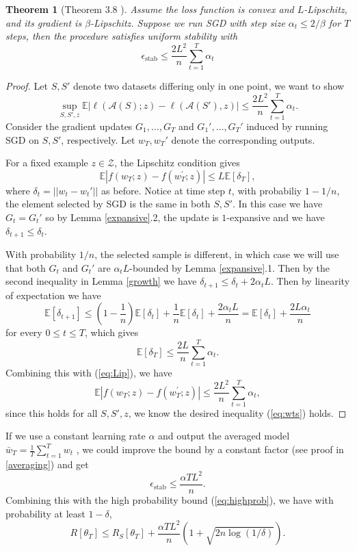 \documentclass{article}[12pt]
\newtheorem{theorem}{Theorem}
\def\A{\mathcal{A}}
\def\E{\mathbb{E}}
\def\Z{\mathcal{Z}}
\newcommand{\norm}[1]{\left|\left|#1\right|\right|}
\newcommand{\abs}[1]{\left\vert#1\right\vert}
\def \E{\mathbb{E}}
\begin{document}
\begin{theorem}[Theorem 3.8 \cite{trainfaster}] \label{sgdstable}
Assume the loss function is convex and $L$-Lipschitz, and its gradient is $\beta$-Lipschitz. Suppose we run SGD with step size $\alpha_t \leq 2/\beta$ for $T$ steps, then the procedure satisfies uniform stability with 
\[
\epsilon_{\text{stab}} \leq \frac{2L^2}{n} \sum_{t=1}^T \alpha_t   
\]
\end{theorem} 
\begin{proof}
Let $S, S'$ denote two datasets differing only in one point, we want to show 
\begin{equation}
   \label{eq:wts}
\sup_{S, S', z} \E\abs{\ell(\A(S); z) - \ell(\A(S'), z)} \leq \frac{2L^2}{n} \sum_{t=1}^T \alpha_t.
\end{equation}
Consider the gradient updates $G_1, \ldots, G_T$ and $G_1', \ldots, G_T'$ induced by running SGD on $S, S'$, respectively. Let $w_T, w_T'$ denote the corresponding outputs.

For a fixed example $z \in \Z$, the Lipschitz condition gives
\begin{equation}
   \label{eq:Lip}
   \mathbb{E}\left|f\left(w_{T} ; z\right)-f\left(w_{T}^{\prime} ; z\right)\right| \leq L \mathbb{E}\left[\delta_T\right],
\end{equation}
where $\delta_t = \norm{w_t - w_t'}$ as before. Notice at time step $t$, with probabiliy $1 - 1/n$, the element selected by SGD is the same in both $S, S'$. In this case we have $G_t = G_t'$ so by Lemma \ref{expansive}.2, the update is $1$-expansive and we have $\delta_{t+1} \leq \delta_t$. 

With probability $1/n$, the selected sample is different, in which case we will use that both $G_t$ and $G_t'$ are $\alpha_t L$-bounded by Lemma \ref{expansive}.1. Then by the second inequality in Lemma \ref{growth} we have $\delta_{t+1} \leq \delta_t + 2\alpha_t L$. Then by linearity of expectation we have 
\[
      \mathbb{E}\left[\delta_{t+1}\right] \leq\left(1-\frac{1}{n}\right) \mathbb{E}\left[\delta_{t}\right]+\frac{1}{n} \mathbb{E}\left[\delta_{t}\right]+\frac{2 \alpha_{t} L}{n}=\mathbb{E}\left[\delta_{t}\right]+\frac{2 L \alpha_{t}}{n} 
\] for every $0 \leq t \leq T$, which gives 
\[
   \mathbb{E}\left[\delta_{T}\right] \leq \frac{2 L}{n} \sum_{t=1}^{T} \alpha_{t}.
\] Combining this with (\ref{eq:Lip}), we have 
\[
   \mathbb{E}\left|f\left(w_{T} ; z\right)-f\left(w_{T}^{\prime} ; z\right)\right| \leq \frac{2L^2}{n} \sum_{t=1}^T \alpha_t, 
\]   since this holds for all $S, S', z$, we know the desired inequality (\ref{eq:wts}) holds.
\end{proof}
If we use a constant learning rate $\alpha$ and output the averaged model $\bar{w}_T = \frac{1}{T} \sum_{t = 1}^{T}  w_t$ , we could improve the bound by a constant factor (see proof in \ref{averaging}) and get 
\[
\epsilon_{\text{stab}} \leq \frac{\alpha T L^2}{n} .
\] 
Combining this with the high probability bound (\ref{eq:highprob}), we have with probability at least $1 - \delta$, 
\[
R[{\theta}_T] \leq R_S[{\theta}_T] + \frac{\alpha T L^2}{n} \left( 1 + \sqrt{2n\log(1/\delta)} \right). 
\] 
\end{document}
